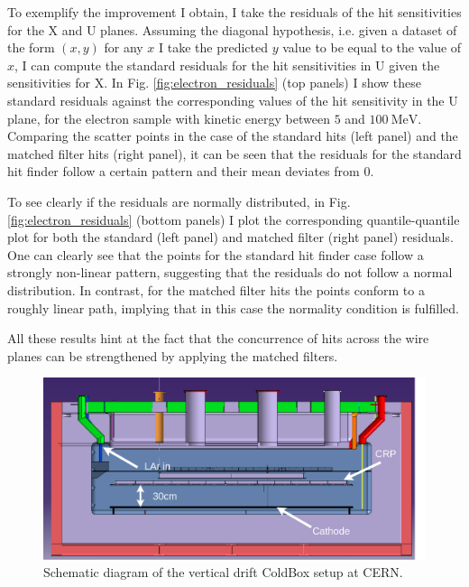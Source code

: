 To exemplify the improvement I obtain, I take the residuals of the hit sensitivities for the X and U planes. Assuming the diagonal hypothesis, i.e. given a dataset of the form $(x, y)$ for any $x$ I take the predicted $y$ value to be equal to the value of $x$, I can compute the standard residuals for the hit sensitivities in U given the sensitivities for X. In Fig. \ref{fig:electron_residuals} (top panels) I show these standard residuals against the corresponding values of the hit sensitivity in the U plane, for the electron sample with kinetic energy between $5$ and $100 \ \mathrm{MeV}$. Comparing the scatter points in the case of the standard hits (left panel) and the matched filter hits (right panel), it can be seen that the residuals for the standard hit finder follow a certain pattern and their mean deviates from $0$.

To see clearly if the residuals are normally distributed, in Fig. \ref{fig:electron_residuals} (bottom panels) I plot the corresponding quantile-quantile plot for both the standard (left panel) and matched filter (right panel) residuals. One can clearly see that the points for the standard hit finder case follow a strongly non-linear pattern, suggesting that the residuals do not follow a normal distribution. In contrast, for the matched filter hits the points conform to a roughly linear path, implying that in this case the normality condition is fulfilled.

All these results hint at the fact that the concurrence of hits across the wire planes can be strengthened by applying the matched filters.

\begin{figure}[t]
    \centering
    \includegraphics[scale = 0.2]{Images/Matched_Filter/VD_Coldbox_Diagram.png}
    \caption{Schematic diagram of the vertical drift ColdBox setup at CERN.}
    \label{fig:vdcoldbox}
\end{figure}

